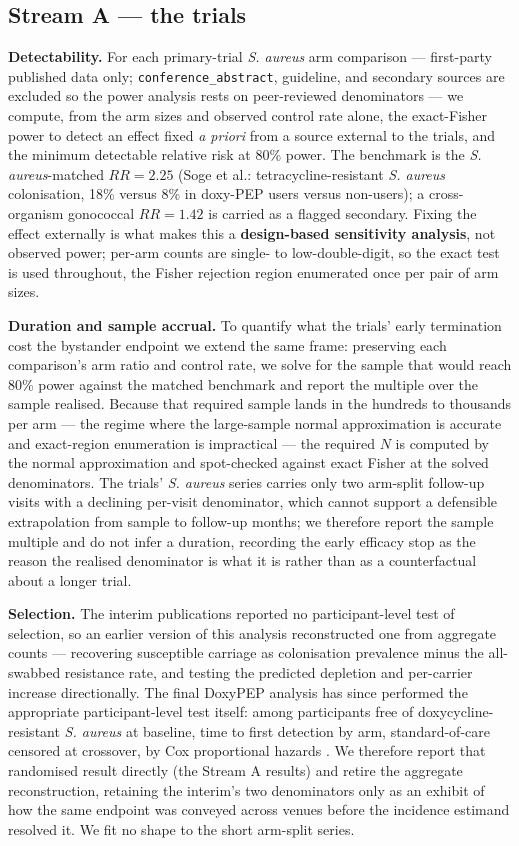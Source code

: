 \documentclass[10pt,letterpaper]{article}
\begin{document}
\subsection*{Stream A --- the trials}

\textbf{Detectability.} For each primary-trial \emph{S. aureus} arm
comparison --- first-party published data only;
\texttt{conference\_abstract}, guideline, and secondary sources are
excluded so the power analysis rests on peer-reviewed denominators ---
we compute, from the arm sizes and observed control rate alone, the
exact-Fisher power to detect an effect fixed \emph{a priori} from a
source external to the trials, and the minimum detectable relative risk
at 80\% power. The benchmark is the \emph{S. aureus}-matched
\(RR = 2.25\) (Soge et al.: tetracycline-resistant \emph{S. aureus}
colonisation, 18\% versus 8\% in doxy-PEP users versus non-users); a
cross-organism gonococcal \(RR = 1.42\) is carried as a flagged
secondary. Fixing the effect externally is what makes this a
\textbf{design-based sensitivity analysis}, not observed power; per-arm
counts are single- to low-double-digit, so the exact test is used
throughout, the Fisher rejection region enumerated once per pair of arm
sizes.

\textbf{Duration and sample accrual.} To quantify what the trials' early
termination cost the bystander endpoint we extend the same frame:
preserving each comparison's arm ratio and control rate, we solve for
the sample that would reach 80\% power against the matched benchmark and
report the multiple over the sample realised. Because that required
sample lands in the hundreds to thousands per arm --- the regime where
the large-sample normal approximation is accurate and exact-region
enumeration is impractical --- the required \(N\) is computed by the
normal approximation and spot-checked against exact Fisher at the solved
denominators. The trials' \emph{S. aureus} series carries only two
arm-split follow-up visits with a declining per-visit denominator, which
cannot support a defensible extrapolation from sample to follow-up
months; we therefore report the sample multiple and do not infer a
duration, recording the early efficacy stop as the reason the realised
denominator is what it is rather than as a counterfactual about a longer
trial.

\textbf{Selection.} The interim publications reported no
participant-level test of selection, so an earlier version of this
analysis reconstructed one from aggregate counts --- recovering
susceptible carriage as colonisation prevalence minus the all-swabbed
resistance rate, and testing the predicted depletion and per-carrier
increase directionally. The final DoxyPEP analysis has since performed
the appropriate participant-level test itself: among participants free
of doxycycline-resistant \emph{S. aureus} at baseline, time to first
detection by arm, standard-of-care censored at crossover, by Cox
proportional hazards \cite{luetkemeyer2025}. We therefore report that
randomised result directly (the Stream A results) and retire the
aggregate reconstruction, retaining the interim's two denominators only
as an exhibit of how the same endpoint was conveyed across venues before
the incidence estimand resolved it. We fit no shape to the short
arm-split series.
\end{document}
